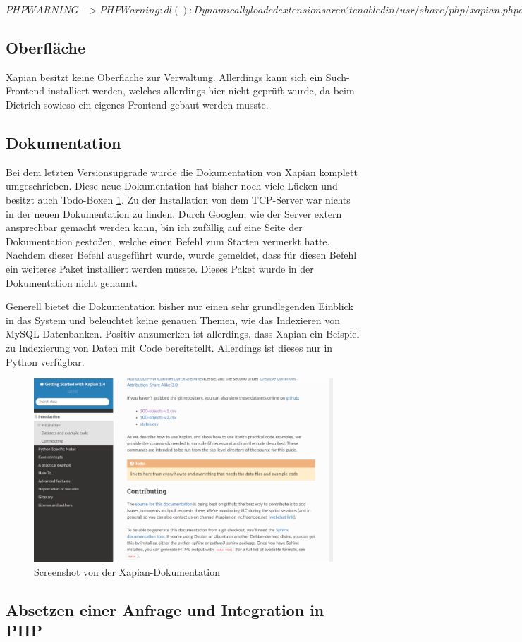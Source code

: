 $PHP WARNING -> PHP Warning:  dl(): Dynamically loaded extensions aren't enabled in /usr/share/php/xapian.php on line 22$


\subsection{Oberfläche}

Xapian besitzt keine Oberfläche zur Verwaltung. Allerdings kann sich ein Such-Frontend installiert werden, welches allerdings hier nicht geprüft wurde, da beim Dietrich sowieso ein eigenes Frontend gebaut werden musste.

\subsection{Dokumentation}

Bei dem letzten Versionsupgrade wurde die Dokumentation von Xapian komplett umgeschrieben. Diese neue Dokumentation hat bisher noch viele Lücken und besitzt auch Todo-Boxen \ref{img:xapianDoku}.
Zu der Installation von dem TCP-Server war nichts in der neuen Dokumentation zu finden. Durch Googlen, wie der Server extern ansprechbar gemacht werden kann, bin ich zufällig auf eine Seite der Dokumentation gestoßen, welche einen Befehl zum Starten vermerkt hatte. Nachdem dieser Befehl ausgeführt wurde, wurde gemeldet, dass für diesen Befehl ein weiteres Paket installiert werden musste. Dieses Paket wurde in der Dokumentation nicht genannt. 

Generell bietet die Dokumentation bisher nur einen sehr grundlegenden Einblick in das System und beleuchtet keine genauen Themen, wie das Indexieren von MySQL-Datenbanken. Positiv anzumerken ist allerdings, dass Xapian ein Beispiel zu Indexierung von Daten mit Code bereitstellt. Allerdings ist dieses nur in Python verfügbar.

\begin{figure}
	\centering
	\includegraphics[width=1\linewidth]{images/xapian_doku.png}
	\caption{Screenshot von der Xapian-Dokumentation}
	\label{img:xapianDoku}
\end{figure}


\subsection{Absetzen einer Anfrage und Integration in PHP}

